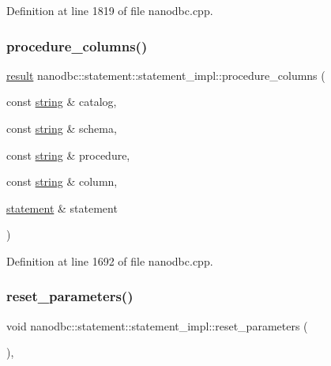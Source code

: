 Definition at line 1819 of file nanodbc.\+cpp.

\mbox{\label{classnanodbc_1_1statement_1_1statement__impl_a26d9e6edf3dd6601cc6e96fa17f1b057}} 
\subsubsection{\texorpdfstring{procedure\_columns()}{procedure\_columns()}}
{\footnotesize\ttfamily \mbox{\hyperlink{classnanodbc_1_1result}{result}} nanodbc\+::statement\+::statement\+\_\+impl\+::procedure\+\_\+columns (\begin{DoxyParamCaption}\item[{const \mbox{\hyperlink{namespacenanodbc_abfc0ece56278e590911ec8352774c212}{string}} \&}]{catalog,  }\item[{const \mbox{\hyperlink{namespacenanodbc_abfc0ece56278e590911ec8352774c212}{string}} \&}]{schema,  }\item[{const \mbox{\hyperlink{namespacenanodbc_abfc0ece56278e590911ec8352774c212}{string}} \&}]{procedure,  }\item[{const \mbox{\hyperlink{namespacenanodbc_abfc0ece56278e590911ec8352774c212}{string}} \&}]{column,  }\item[{\mbox{\hyperlink{classnanodbc_1_1statement}{statement}} \&}]{statement }\end{DoxyParamCaption})\hspace{0.3cm}{\ttfamily [inline]}}



Definition at line 1692 of file nanodbc.\+cpp.

\mbox{\label{classnanodbc_1_1statement_1_1statement__impl_a64eaf2b2dc3531a1f00253ba5606366f}} 
\subsubsection{\texorpdfstring{reset\_parameters()}{reset\_parameters()}}
{\footnotesize\ttfamily void nanodbc\+::statement\+::statement\+\_\+impl\+::reset\+\_\+parameters (\begin{DoxyParamCaption}{ }\end{DoxyParamCaption})\hspace{0.3cm}{\ttfamily [inline]}, {\ttfamily [noexcept]}}



